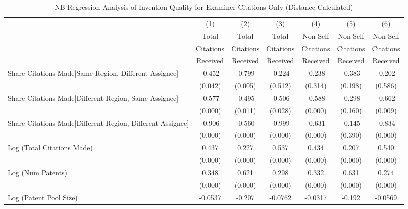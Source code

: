 \begin{table}[htbp]\centering \caption{NB Regression Analysis of Invention Quality for Examiner Citations Only (Distance Calculated) \label{e.model123192021}} 
\scriptsize
\singlespacing
\begin{tabular}{l*{6}{c}} \hline\hline
                &\multicolumn{1}{c}{(1)}&\multicolumn{1}{c}{(2)}&\multicolumn{1}{c}{(3)}&\multicolumn{1}{c}{(4)}&\multicolumn{1}{c}{(5)}&\multicolumn{1}{c}{(6)}\\
                 &\multicolumn{1}{c}{Total}&\multicolumn{1}{c}{Total}&\multicolumn{1}{c}{Total}&\multicolumn{1}{c}{Non-Self}&\multicolumn{1}{c}{Non-Self}&\multicolumn{1}{c}{Non-Self}\\
                &\multicolumn{1}{c}{Citations}&\multicolumn{1}{c}{Citations}&\multicolumn{1}{c}{Citations}&\multicolumn{1}{c}{Citations}&\multicolumn{1}{c}{Citations}&\multicolumn{1}{c}{Citations}\\
                 &\multicolumn{1}{c}{Received}&\multicolumn{1}{c}{Received}&\multicolumn{1}{c}{Received}&\multicolumn{1}{c}{Received}&\multicolumn{1}{c}{Received}&\multicolumn{1}{c}{Received}\\
\hline
Share Citations Made[Same Region, Different Assignee]&   -0.452&   -0.799&   -0.224&   -0.238&   -0.383&   -0.202\\
                &  (0.042)&  (0.005)&  (0.512)&  (0.314)&  (0.198)&  (0.586)\\
Share Citations Made[Different Region, Same Assignee]&   -0.577&   -0.495&   -0.506&   -0.588&   -0.298&   -0.662\\
                &  (0.000)&  (0.011)&  (0.028)&  (0.000)&  (0.160)&  (0.009)\\
Share Citations Made[Different Region, Different Assignee]&   -0.906&   -0.560&   -0.999&   -0.631&   -0.145&   -0.834\\
                &  (0.000)&  (0.000)&  (0.000)&  (0.000)&  (0.390)&  (0.000)\\
Log (Total Citations Made)&    0.437&    0.227&    0.537&    0.434&    0.207&    0.540\\
                &  (0.000)&  (0.000)&  (0.000)&  (0.000)&  (0.000)&  (0.000)\\
Log (Num Patents)&    0.348&    0.621&    0.298&    0.332&    0.631&    0.274\\
                &  (0.000)&  (0.000)&  (0.000)&  (0.000)&  (0.000)&  (0.000)\\
Log (Patent Pool Size)&  -0.0537&   -0.207&  -0.0762&  -0.0317&   -0.192&  -0.0569\\

\end{tabular}
\end{table}
